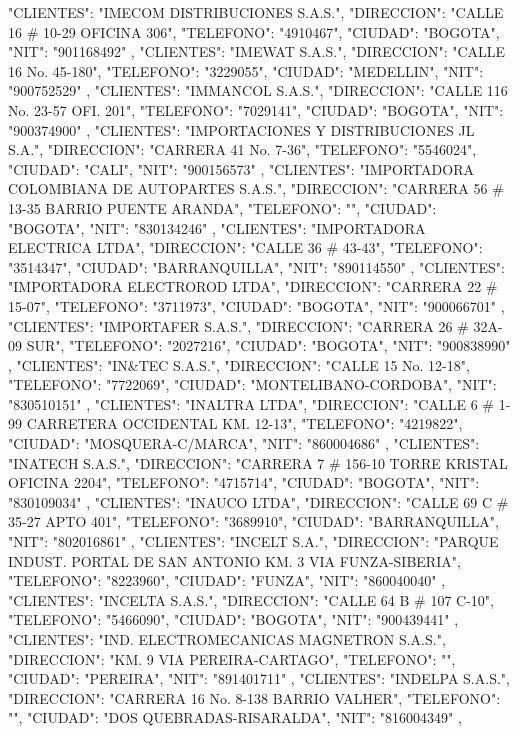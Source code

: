    {
   "CLIENTES": "IMECOM DISTRIBUCIONES S.A.S.",
   "DIRECCION": "CALLE 16 # 10-29 OFICINA 306",
   "TELEFONO": "4910467",
   "CIUDAD": "BOGOTA",
   "NIT": "901168492"
   },
   {
   "CLIENTES": "IMEWAT S.A.S.",
   "DIRECCION": "CALLE 16 No. 45-180",
   "TELEFONO": "3229055",
   "CIUDAD": "MEDELLIN",
   "NIT": "900752529"
   },
   {
   "CLIENTES": "IMMANCOL S.A.S.",
   "DIRECCION": "CALLE 116 No. 23-57 OFI. 201",
   "TELEFONO": "7029141",
   "CIUDAD": "BOGOTA",
   "NIT": "900374900"
   },
   {
   "CLIENTES": "IMPORTACIONES Y DISTRIBUCIONES JL S.A.",
   "DIRECCION": "CARRERA 41 No. 7-36",
   "TELEFONO": "5546024",
   "CIUDAD": "CALI",
   "NIT": "900156573"
   },
   {
   "CLIENTES": "IMPORTADORA COLOMBIANA DE AUTOPARTES S.A.S.",
   "DIRECCION": "CARRERA 56 # 13-35 BARRIO PUENTE ARANDA",
   "TELEFONO": "",
   "CIUDAD": "BOGOTA",
   "NIT": "830134246"
   },
   {
   "CLIENTES": "IMPORTADORA ELECTRICA LTDA",
   "DIRECCION": "CALLE 36 # 43-43",
   "TELEFONO": "3514347",
   "CIUDAD": "BARRANQUILLA",
   "NIT": "890114550"
   },
   {
   "CLIENTES": "IMPORTADORA ELECTROROD LTDA",
   "DIRECCION": "CARRERA 22 # 15-07",
   "TELEFONO": "3711973",
   "CIUDAD": "BOGOTA",
   "NIT": "900066701"
   },
   {
   "CLIENTES": "IMPORTAFER S.A.S.",
   "DIRECCION": "CARRERA 26 # 32A-09 SUR",
   "TELEFONO": "2027216",
   "CIUDAD": "BOGOTA",
   "NIT": "900838990"
   },
   {
   "CLIENTES": "IN&TEC S.A.S.",
   "DIRECCION": "CALLE 15 No. 12-18",
   "TELEFONO": "7722069",
   "CIUDAD": "MONTELIBANO-CORDOBA",
   "NIT": "830510151"
   },
   {
   "CLIENTES": "INALTRA LTDA",
   "DIRECCION": "CALLE 6 # 1-99 CARRETERA OCCIDENTAL KM. 12-13",
   "TELEFONO": "4219822",
   "CIUDAD": "MOSQUERA-C/MARCA",
   "NIT": "860004686"
   },
   {
   "CLIENTES": "INATECH S.A.S.",
   "DIRECCION": "CARRERA 7 # 156-10 TORRE KRISTAL OFICINA 2204",
   "TELEFONO": "4715714",
   "CIUDAD": "BOGOTA",
   "NIT": "830109034"
   },
   {
   "CLIENTES": "INAUCO LTDA",
   "DIRECCION": "CALLE 69 C # 35-27 APTO 401",
   "TELEFONO": "3689910",
   "CIUDAD": "BARRANQUILLA",
   "NIT": "802016861"
   },
   {
   "CLIENTES": "INCELT S.A.",
   "DIRECCION": "PARQUE INDUST. PORTAL DE SAN ANTONIO KM. 3 VIA FUNZA-SIBERIA",
   "TELEFONO": "8223960",
   "CIUDAD": "FUNZA",
   "NIT": "860040040"
   },
   {
   "CLIENTES": "INCELTA S.A.S.",
   "DIRECCION": "CALLE 64 B # 107 C-10",
   "TELEFONO": "5466090",
   "CIUDAD": "BOGOTA",
   "NIT": "900439441"
   },
   {
   "CLIENTES": "IND. ELECTROMECANICAS MAGNETRON S.A.S.",
   "DIRECCION": "KM. 9 VIA PEREIRA-CARTAGO",
   "TELEFONO": "",
   "CIUDAD": "PEREIRA",
   "NIT": "891401711"
   },
   {
   "CLIENTES": "INDELPA S.A.S.",
   "DIRECCION": "CARRERA 16 No. 8-138 BARRIO VALHER",
   "TELEFONO": "",
   "CIUDAD": "DOS QUEBRADAS-RISARALDA",
   "NIT": "816004349"
   },
